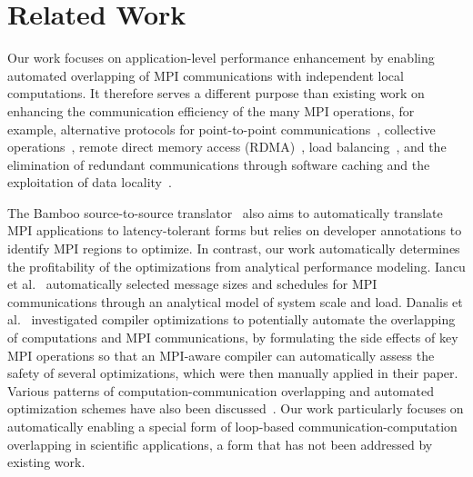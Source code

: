 \section{Related Work}
\label{sec-related}

Our work focuses on application-level performance
enhancement by enabling automated overlapping of MPI communications
with independent local computations. It therefore serves a different purpose than
existing work on enhancing the communication efficiency of the many 
MPI operations, for example, alternative protocols for point-to-point
communications~\cite{brightwell:eurompi03,denis:eurompi11}, collective
operations~\cite{traff:eurompi14:ocd,traff:eurompi14:mcd,graham:eurompi08,mittal:ppopp12},
remote direct memory access
(RDMA)~\cite{liu:ics03,woodall:eurompi06,hatanaka:eurompi13}, load
balancing~\cite{nian:niss09,kale:eurompi14}, and the
elimination of redundant communications through software caching and
the exploitation of data
locality~\cite{buntinas:icpp09,isujita:eurompi14,ozog:ics13}.  

The Bamboo source-to-source translator~\cite{Bamboo:SC12} also aims to automatically translate MPI applications to latency-tolerant forms but relies on developer annotations to identify MPI regions to optimize. 
In contrast, our work automatically determines
the profitability of the optimizations from analytical performance modeling. 
Iancu et al.~\cite{iancu:ppopp07} automatically selected
message sizes and schedules for MPI communications through an
analytical model of system scale and load. %
Danalis et al.~\cite{danalis:ics09} investigated compiler
optimizations to potentially automate the overlapping of 
computations and MPI communications, by formulating the side effects of key MPI operations so that
an MPI-aware compiler can automatically assess the safety of several
optimizations, which were then manually applied in their paper.
Various patterns of computation-communication overlapping and
automated optimization schemes have also been
discussed~\cite{danalis:sc05,fishgold:ipdps06}.  
Our work particularly focuses on automatically enabling 
a special form of loop-based
communication-computation overlapping in scientific applications, a form that has not been addressed
by existing work. 

